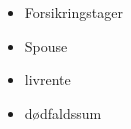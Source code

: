 \begin{itemize}
	\item Forsikringstager
	\item Spouse
	\item livrente
	\item dødfaldssum
\end{itemize}